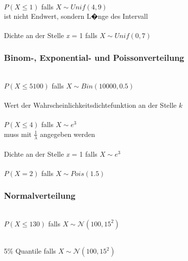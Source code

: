 \documentclass{article}
\begin{document}
\begin{multicols*}{3}
 \\
$P(X \leq 1)$ falls $X \sim Unif(4, 9)$ \\
\colorbox{red!20!white}{ ist nicht Endwert, sondern L�nge des Intervall}\\

 \\
Dichte an der Stelle \textit{x} = 1 falls $X \sim Unif(0, 7)$

\subsubsection*{Binom-, Exponential- und Poissonverteilung}

 \\
$P(X \leq 5100)$ falls $X \sim Bin(10000, 0.5)$ \\

 \\
Wert der Wahrscheinlichkeitsdichtefunktion an der Stelle $k$ \\

 \\
$P(X \leq 4)$ falls $X \sim e^{3}$ \\
\colorbox{red!20!white}{ muss mit $\frac{1}{\lambda}$ angegeben werden}\\

 \\
Dichte an der Stelle \textit{x} = 1 falls $X \sim e^{3}$ \\

 \\
$P(X = 2)$ falls $X \sim Pois(1.5)$

\subsubsection*{Normalverteilung}

 \\
$P(X \leq 130)$ falls $X \sim \mathcal{N}(100, 15^2)$

 \\
5\% Quantile falls $X \sim \mathcal{N}(100, 15^2)$ \\


\end{multicols*}
\end{document}
